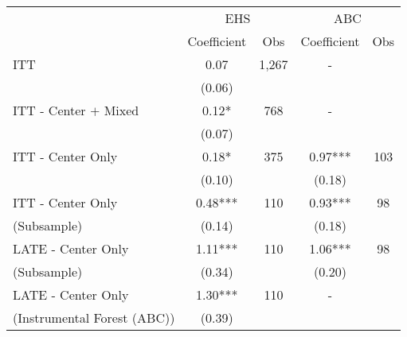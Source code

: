 \begin{tabular}{lcccc}
\toprule 
\midrule 
 & \multicolumn{2}{c}{EHS} & \multicolumn{2}{c}{ABC} \\
 \cmidrule(lr){2-3} \cmidrule(lr){4-5} 
 & Coefficient & Obs & Coefficient & Obs \\
\midrule 
ITT & 0.07 & 1,267 & - \\
 & (0.06) &  \\
ITT - Center $+$ Mixed & 0.12* & 768 & - \\
 & (0.07) &  \\
ITT - Center Only & 0.18* & 375 & 0.97*** & 103 \\
 & (0.10) &  & (0.18) &  \\
ITT - Center Only & 0.48*** & 110 & 0.93*** & 98 \\
(Subsample) & (0.14) &  & (0.18) &  \\
LATE - Center Only & 1.11*** & 110 & 1.06*** & 98 \\
(Subsample) & (0.34) &  & (0.20) &  \\
LATE - Center Only & 1.30*** & 110 & - \\
(Instrumental Forest (ABC)) & (0.39) &  \\
\midrule 
\bottomrule 
\end{tabular}
